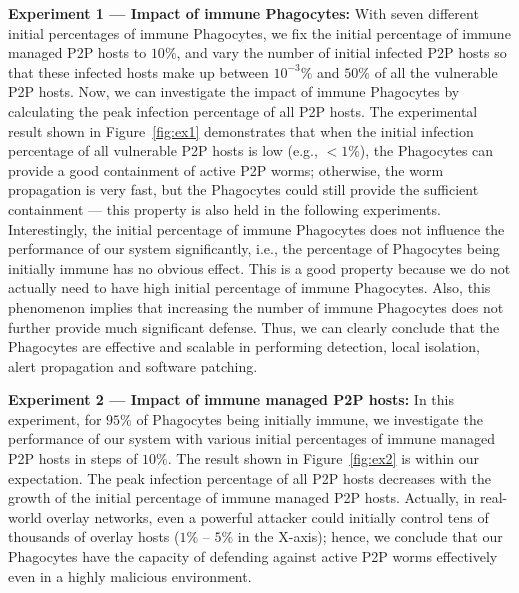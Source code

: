 \documentclass[times,10pt,twocolumn]{article}
\begin{document}
\textbf{Experiment 1 --- Impact of immune Phagocytes:} With seven
different initial percentages of immune Phagocytes, we fix the
initial percentage of immune managed P2P hosts to $10\%$, and vary
the number of initial infected P2P hosts so that these infected
hosts make up between $10^{-3}\%$ and $50\%$ of all the vulnerable
P2P hosts. Now, we can investigate the impact of immune Phagocytes
by calculating the peak infection percentage of all P2P hosts. The
experimental result shown in Figure~\ref{fig:ex1} demonstrates that
when the initial infection percentage of all vulnerable P2P hosts is
low (e.g., $< 1\%$), the Phagocytes can provide a good containment
of active P2P worms; otherwise, the worm propagation is very fast,
but the Phagocytes could still provide the sufficient containment
--- this property is also held in the following experiments.
Interestingly, the initial percentage of immune Phagocytes does not
influence the performance of our system significantly, i.e., the
percentage of Phagocytes being initially immune has no obvious
effect. This is a good property because we do not actually need to
have high initial percentage of immune Phagocytes. Also, this
phenomenon implies that increasing the number of immune Phagocytes
does not further provide much significant defense. Thus, we can
clearly conclude that the Phagocytes are effective and scalable in
performing detection, local isolation, alert propagation and
software patching.









\textbf{Experiment 2 --- Impact of immune managed P2P hosts:} In
this experiment, for $95\%$ of Phagocytes being initially immune, we
investigate the performance of our system with various initial
percentages of immune managed P2P hosts in steps of $10\%$. The
result shown in Figure~\ref{fig:ex2} is within our expectation. The
peak infection percentage of all P2P hosts decreases with the growth
of the initial percentage of immune managed P2P hosts. Actually, in
real-world overlay networks, even a powerful attacker could
initially control tens of thousands of overlay hosts ($1\%$ -- $5\%$
in the X-axis); hence, we conclude that our Phagocytes have the
capacity of defending against active P2P worms effectively even in a
highly malicious environment.
\end{document}
